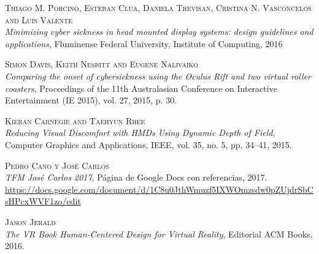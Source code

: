 \documentclass[12pt,a4paper]{article}
\begin{document}
\break

\begin{thebibliography}{X}

\textsc{Thiago M. Porcino, Esteban Clua, Daniela Trevisan, Cristina N. Vasconcelos and Luis Valente}\\
\textit{Minimizing cyber sickness in head mounted display systems: design guidelines and applications}, Fluminense Federal University, Institute of Computing, 2016

\textsc{Simon Davis, Keith Nesbitt and Eugene Nalivaiko}\\
\textit{Comparing the onset of cybersickness using the Oculus Rift and two virtual roller coasters}, Proceedings of the 11th Australasian Conference on Interactive Entertainment (IE 2015), vol. 27, 2015, p. 30.

\textsc{Kieran Carnegie and Taehyun Rhee}\\
\textit{Reducing Visual Discomfort with HMDs Using Dynamic Depth of Field}, Computer Graphics and Applications, IEEE, vol. 35, no. 5, pp. 34–41, 2015.

\textsc{Pedro Cano y José Carlos}\\
\textit{TFM José Carlos 2017}, Página de Google Docs con referencias, 2017.\\
\url{https://docs.google.com/document/d/1C8u0JthWmuzf5IXWOmzsdw0pZUjdrSbCsHPcxWVF1zo/edit}

\textsc{Jason Jerald}\\
\textit{The VR Book Human-Centered Design for Virtual Reality}, Editorial ACM Books, 2016.

\end{thebibliography}
\end{document}
